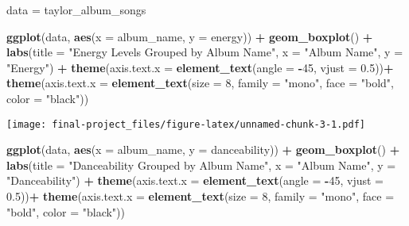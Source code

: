 \documentclass[
]{article}
\newenvironment{Shaded}{\begin{snugshade}}{\end{snugshade}}
\newcommand{\AttributeTok}[1]{\textcolor[rgb]{0.13,0.29,0.53}{#1}}
\newcommand{\DecValTok}[1]{\textcolor[rgb]{0.00,0.00,0.81}{#1}}
\newcommand{\FloatTok}[1]{\textcolor[rgb]{0.00,0.00,0.81}{#1}}
\newcommand{\FunctionTok}[1]{\textcolor[rgb]{0.13,0.29,0.53}{\textbf{#1}}}
\newcommand{\NormalTok}[1]{#1}
\newcommand{\OtherTok}[1]{\textcolor[rgb]{0.56,0.35,0.01}{#1}}
\newcommand{\SpecialCharTok}[1]{\textcolor[rgb]{0.81,0.36,0.00}{\textbf{#1}}}
\newcommand{\StringTok}[1]{\textcolor[rgb]{0.31,0.60,0.02}{#1}}
\begin{document}
\begin{Shaded}
\begin{Highlighting}[]
\NormalTok{data }\OtherTok{=}\NormalTok{ taylor\_album\_songs}

\FunctionTok{ggplot}\NormalTok{(data, }\FunctionTok{aes}\NormalTok{(}\AttributeTok{x =}\NormalTok{ album\_name, }\AttributeTok{y =}\NormalTok{ energy)) }\SpecialCharTok{+}
  \FunctionTok{geom\_boxplot}\NormalTok{() }\SpecialCharTok{+}
  \FunctionTok{labs}\NormalTok{(}\AttributeTok{title =} \StringTok{"Energy Levels Grouped by Album Name"}\NormalTok{, }
       \AttributeTok{x =} \StringTok{"Album Name"}\NormalTok{, }
       \AttributeTok{y =} \StringTok{"Energy"}\NormalTok{) }\SpecialCharTok{+}
  \FunctionTok{theme}\NormalTok{(}\AttributeTok{axis.text.x =} \FunctionTok{element\_text}\NormalTok{(}\AttributeTok{angle =} \SpecialCharTok{{-}}\DecValTok{45}\NormalTok{, }\AttributeTok{vjust =} \FloatTok{0.5}\NormalTok{))}\SpecialCharTok{+}
  \FunctionTok{theme}\NormalTok{(}\AttributeTok{axis.text.x =} \FunctionTok{element\_text}\NormalTok{(}\AttributeTok{size =} \DecValTok{8}\NormalTok{, }\AttributeTok{family =} \StringTok{"mono"}\NormalTok{, }\AttributeTok{face =} \StringTok{"bold"}\NormalTok{, }\AttributeTok{color =} \StringTok{"black"}\NormalTok{))}
\end{Highlighting}
\end{Shaded}

\texttt{[image: final-project\_files/figure-latex/unnamed-chunk-3-1.pdf]}

\begin{Shaded}
\begin{Highlighting}[]
\FunctionTok{ggplot}\NormalTok{(data, }\FunctionTok{aes}\NormalTok{(}\AttributeTok{x =}\NormalTok{ album\_name, }\AttributeTok{y =}\NormalTok{ danceability)) }\SpecialCharTok{+}
  \FunctionTok{geom\_boxplot}\NormalTok{() }\SpecialCharTok{+}
  \FunctionTok{labs}\NormalTok{(}\AttributeTok{title =} \StringTok{"Danceability Grouped by Album Name"}\NormalTok{, }
       \AttributeTok{x =} \StringTok{"Album Name"}\NormalTok{, }
       \AttributeTok{y =} \StringTok{"Danceability"}\NormalTok{) }\SpecialCharTok{+}
  \FunctionTok{theme}\NormalTok{(}\AttributeTok{axis.text.x =} \FunctionTok{element\_text}\NormalTok{(}\AttributeTok{angle =} \SpecialCharTok{{-}}\DecValTok{45}\NormalTok{, }\AttributeTok{vjust =} \FloatTok{0.5}\NormalTok{))}\SpecialCharTok{+}
  \FunctionTok{theme}\NormalTok{(}\AttributeTok{axis.text.x =} \FunctionTok{element\_text}\NormalTok{(}\AttributeTok{size =} \DecValTok{8}\NormalTok{, }\AttributeTok{family =} \StringTok{"mono"}\NormalTok{, }\AttributeTok{face =} \StringTok{"bold"}\NormalTok{, }\AttributeTok{color =} \StringTok{"black"}\NormalTok{))}
\end{Highlighting}
\end{Shaded}
\end{document}
